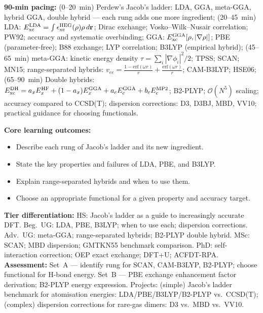 \documentclass[11pt,a4paper]{article}
\begin{document}
\begin{tcolorbox}[chembox, title={Module~III.3 --- Lecture L04: Overview of XC Functionals --- Jacob's Ladder}]
\textbf{90-min pacing:} (0--20~min) Perdew's Jacob's ladder: LDA, GGA, meta-GGA, hybrid GGA, double hybrid --- each rung adds one more ingredient; (20--45~min) LDA: $E_{\rm xc}^{\rm LDA}=\int\epsilon_{\rm xc}^{\rm HEG}(\rho)\rho\,d\mathbf{r}$; Dirac exchange; Vosko--Wilk--Nusair correlation; PW92; accuracy and systematic overbinding; GGA: $E_{\rm xc}^{\rm GGA}[\rho,|\nabla\rho|]$; PBE (parameter-free); B88 exchange; LYP correlation; B3LYP (empirical hybrid); (45--65~min) meta-GGA: kinetic energy density $\tau=\sum_i|\nabla\phi_i|^2/2$; TPSS; SCAN; MN15; range-separated hybrids: $v_{ee}=\tfrac{1-\text{erf}(\omega r)}{r}+\tfrac{\text{erf}(\omega r)}{r}$; CAM-B3LYP; HSE06; (65--90~min) Double hybrids: $E_{\rm xc}^{\rm DH}=a_x E_x^{\rm HF}+(1-a_x)E_x^{\rm GGA}+a_c E_c^{\rm GGA}+b_c E_c^{\rm MP2}$; B2-PLYP; $\mathcal{O}(N^5)$ scaling; accuracy compared to CCSD(T); dispersion corrections: D3, D3BJ, MBD, VV10; practical guidance for choosing functionals.

\medskip\textbf{Core learning outcomes:}
\begin{itemize}[leftmargin=1.4em,topsep=2pt,itemsep=1pt]
  \item Describe each rung of Jacob's ladder and its new ingredient.
  \item State the key properties and failures of LDA, PBE, and B3LYP.
  \item Explain range-separated hybrids and when to use them.
  \item Choose an appropriate functional for a given property and accuracy target.
\end{itemize}
\medskip\textbf{Tier differentiation:}
HS: Jacob's ladder as a guide to increasingly accurate DFT.
Beg.\ UG: LDA, PBE, B3LYP; when to use each; dispersion corrections.
Adv.\ UG: meta-GGA; range-separated hybrids; B2-PLYP double hybrid.
MSc: SCAN; MBD dispersion; GMTKN55 benchmark comparison.
PhD: self-interaction correction; OEP exact exchange; DFT+U; ACFDT-RPA.
\medskip\textbf{Assessment:}
Set~A --- identify rung for SCAN, CAM-B3LYP, B2-PLYP; choose functional for H-bond energy.
Set~B --- PBE exchange enhancement factor derivation; B2-PLYP energy expression.
Projects: (simple) Jacob's ladder benchmark for atomisation energies: LDA/PBE/B3LYP/B2-PLYP vs.\ CCSD(T); (complex) dispersion corrections for rare-gas dimers: D3 vs.\ MBD vs.\ VV10.
\end{tcolorbox}
\end{document}
